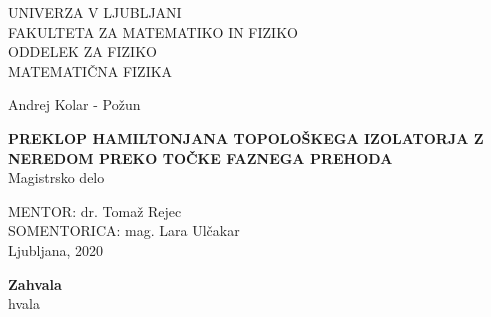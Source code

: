 \pagestyle{empty}
\begin{center}

{\large UNIVERZA V LJUBLJANI\\
FAKULTETA ZA MATEMATIKO IN FIZIKO\\
ODDELEK ZA FIZIKO\\
MATEMATIČNA FIZIKA\\}


\vspace{4cm}


{\Large Andrej Kolar - Požun\\}

\vspace{10mm}

{\bf \Large PREKLOP HAMILTONJANA TOPOLOŠKEGA IZOLATORJA Z NEREDOM PREKO TOČKE FAZNEGA PREHODA}\\
\vspace{5mm}
{\large Magistrsko delo}\\




\vfill



{\large MENTOR: dr. Tomaž Rejec\\
SOMENTORICA: mag. Lara Ulčakar\\


\vspace{2cm}
Ljubljana, 2020}

\end{center}


\cleardoublepage
\mbox{}
\vfill
{\Large \bf Zahvala}
\vspace{1cm}\\
hvala


